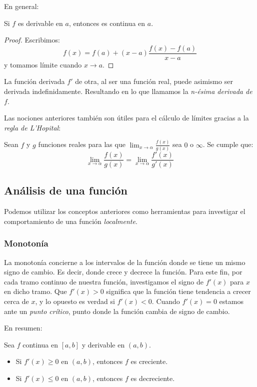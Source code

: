 \documentclass[10pt]{article}
\begin{document}
En general:

\begin{theorem}
  Si $f$ es derivable en $a$, entonces es continua en $a$.
\end{theorem}

\begin{proof}
  Escribimos:
  \[ f(x) = f(a) + (x-a)\frac{f(x)-f(a)}{x-a} \]
  y tomamos límite cuando $x \to a$.
\end{proof}

La función derivada $ f' $ de otra, al ser una función real, puede asimismo ser derivada indefinidamente. Resultando en lo que llamamos la \textit{n-ésima derivada de $ f $}. 

Las nociones anteriores también son útiles para el cálculo de límites gracias a la \textit{regla de L'Hopital}:

\begin{theorem}
  Sean $ f $ y $ g $ funciones reales para las que $ \lim_{x \to \alpha} \frac{f(x)}{g(x)} $ sea $ 0 $ o $ \infty $. Se cumple que:
  \[ \lim_{x \to \alpha} \frac{f(x)}{g(x)} = \lim_{x \to \alpha} \frac{f'(x)}{g'(x)} \]
\end{theorem}

\subsection{Análisis de una función}

Podemos utilizar los conceptos anteriores como herramientas para investigar el comportamiento de una función \textit{localmente}.

\subsubsection{Monotonía}

La monotonía concierne a los intervalos de la función donde se tiene un mismo signo de cambio. Es decir, donde crece y decrece la función. Para este fin, por cada tramo continuo de nuestra función,
investigamos el signo de $ f'(x) $ para $ x $ en dicho tramo. Que $ f'(x) > 0 $ significa que la función tiene tendencia a crecer cerca de $ x $, y lo opuesto es verdad si $ f'(x) < 0 $. Cuando
$ f'(x) = 0 $ estamos ante un \textit{punto crítico}, punto donde la función cambia de signo de cambio.

En resumen:

\begin{theorem}
  Sea $f$ continua en $[a,b]$ y derivable en $(a,b)$.
  \begin{itemize}
    \item Si $f'(x) \ge 0$ en $(a,b)$, entonces $f$ es creciente.
    \item Si $f'(x) \le 0$ en $(a,b)$, entonces $f$ es decreciente.
  \end{itemize}
\end{theorem}
\end{document}
